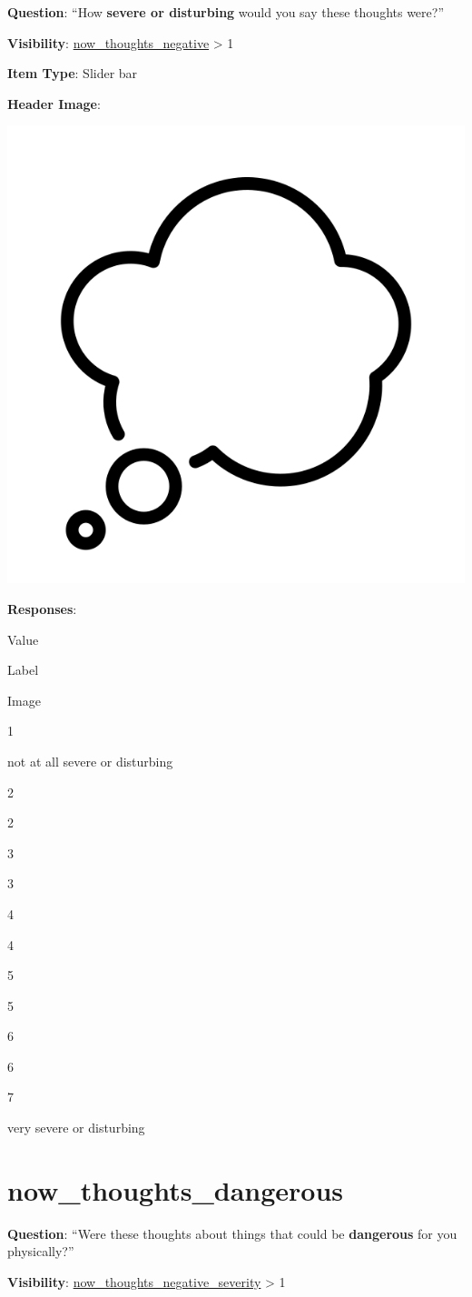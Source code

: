 \documentclass[]{book}
\begin{document}
\textbf{Question}: ``How \textbf{severe or disturbing} would you say these thoughts were?''

\textbf{Visibility}: \protect\hyperlink{now_thoughts_negative}{now\_thoughts\_negative} \textgreater{} 1

\textbf{Item Type}: Slider bar

\textbf{Header Image}:

\begin{flushleft}\includegraphics[width=0.33\linewidth]{downloadFigs4latex_NIMH_Applet_Codebook/now_thoughts_negative_severity_headerImg} \end{flushleft}

\textbf{Responses}:

Value

Label

Image

1

not at all severe or disturbing

2

2

3

3

4

4

5

5

6

6

7

very severe or disturbing

\hypertarget{now_thoughts_dangerous}{%
\section{now\_thoughts\_dangerous}\label{now_thoughts_dangerous}}

\textbf{Question}: ``Were these thoughts about things that could be \textbf{dangerous} for you physically?''

\textbf{Visibility}: \protect\hyperlink{now_thoughts_negative_severity}{now\_thoughts\_negative\_severity} \textgreater{} 1
\end{document}
